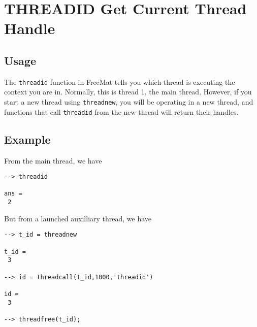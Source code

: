 \section{THREADID Get Current Thread Handle}

\subsection{Usage}

The \verb|threadid| function in FreeMat tells you which thread
is executing the context you are in.  Normally, this is thread
1, the main thread.  However, if you start a new thread using
\verb|threadnew|, you will be operating in a new thread, and functions
that call \verb|threadid| from the new thread will return their 
handles.
\subsection{Example}

From the main thread, we have
\begin{verbatim}
--> threadid

ans = 
 2 
\end{verbatim}
But from a launched auxilliary thread, we have
\begin{verbatim}
--> t_id = threadnew

t_id = 
 3 

--> id = threadcall(t_id,1000,'threadid')

id = 
 3 

--> threadfree(t_id);
\end{verbatim}
